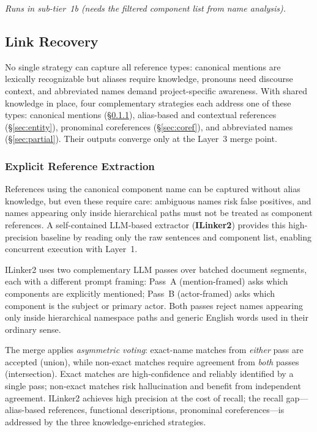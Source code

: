 \emph{Runs in sub-tier~1b (needs the filtered component list from
name analysis).}


\subsection{Link Recovery}\label{sec:recovery}

No single strategy can capture all reference types:
canonical mentions are lexically recognizable but aliases require
knowledge, pronouns need discourse context, and abbreviated names
demand project-specific awareness.
With shared knowledge in place, four complementary strategies
each address one of these types:
canonical mentions (\S\ref{sec:seed}),
alias-based and contextual references (\S\ref{sec:entity}),
pronominal coreferences (\S\ref{sec:coref}), and
abbreviated names (\S\ref{sec:partial}).
Their outputs converge only at the Layer~3 merge point.

\subsubsection{Explicit Reference Extraction}\label{sec:seed}

References using the canonical component name can be captured
without alias knowledge, but even these require care: ambiguous
names risk false positives, and names appearing only inside
hierarchical paths must not be treated as component references.
A self-contained LLM-based extractor (\textbf{ILinker2})
provides this high-precision baseline by reading only the raw
sentences and component list, enabling concurrent execution with
Layer~1.

ILinker2 uses two complementary LLM passes over batched document
segments, each with a different prompt framing:
Pass~A (mention-framed) asks which components are explicitly
mentioned; Pass~B (actor-framed) asks which component is the subject
or primary actor.
Both passes reject names appearing only inside hierarchical
namespace paths and generic English words used in their ordinary
sense.

The merge applies \emph{asymmetric voting}:
exact-name matches from \emph{either} pass are accepted (union),
while non-exact matches require agreement from \emph{both} passes
(intersection).
Exact matches are high-confidence and reliably identified by a single
pass; non-exact matches risk hallucination and benefit from
independent agreement.
ILinker2 achieves high precision at the cost of recall;
the recall gap---alias-based references, functional descriptions,
pronominal coreferences---is addressed by the three knowledge-enriched
strategies.

